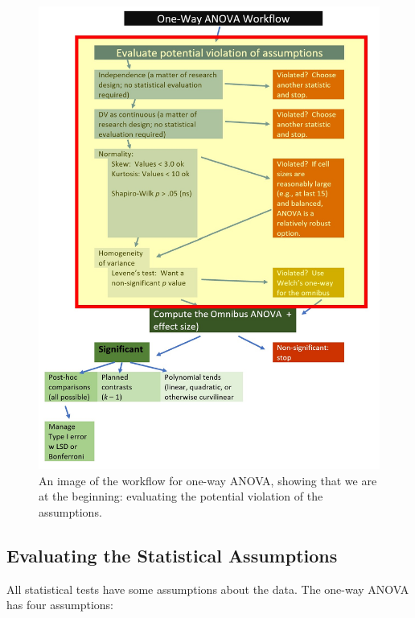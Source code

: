\documentclass[
  11pt,
]{book}
\begin{document}
\begin{figure}
\centering
\includegraphics{images/oneway/OnewayWrkFlw_Asmptns.jpg}
\caption{An image of the workflow for one-way ANOVA, showing that we are at the beginning: evaluating the potential violation of the assumptions.}
\end{figure}

\hypertarget{evaluating-the-statistical-assumptions-3}{%
\subsection{Evaluating the Statistical Assumptions}\label{evaluating-the-statistical-assumptions-3}}

All statistical tests have some assumptions about the data. The one-way ANOVA has four assumptions:
\end{document}
